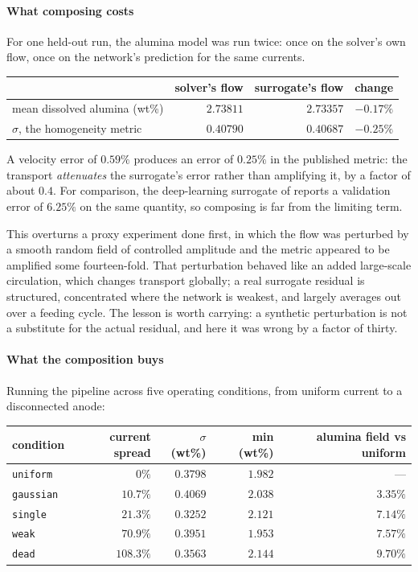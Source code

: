 \documentclass[11pt,a4paper]{article}
\theoremstyle{plain}
\theoremstyle{definition}
\theoremstyle{remark}
\begin{document}
\paragraph{What composing costs}
For one held-out run, the alumina model was run twice: once on the solver's own
flow, once on the network's prediction for the same currents.
\begin{center}
\small
\begin{tabular}{@{}lrrr@{}}
\toprule
& solver's flow & surrogate's flow & change \\
\midrule
mean dissolved alumina (wt\%)        & $2.73811$ & $2.73357$ & $-0.17\%$ \\
$\sigma$, the homogeneity metric     & $0.40790$ & $0.40687$ & $\mathbf{-0.25\%}$ \\
\bottomrule
\end{tabular}
\end{center}
A velocity error of $0.59\%$ produces an error of $0.25\%$ in the published
metric: the transport \emph{attenuates} the surrogate's error rather than
amplifying it, by a factor of about $0.4$. For comparison, the deep-learning
surrogate of \cite{patouillet} reports a validation error of $6.25\%$ on the same
quantity, so composing is far from the limiting term.

This overturns a proxy experiment done first, in which the flow was perturbed by
a smooth random field of controlled amplitude and the metric appeared to be
amplified some fourteen-fold. That perturbation behaved like an added large-scale
circulation, which changes transport globally; a real surrogate residual is
structured, concentrated where the network is weakest, and largely averages out
over a feeding cycle. The lesson is worth carrying: a synthetic perturbation is
not a substitute for the actual residual, and here it was wrong by a factor of
thirty.

\paragraph{What the composition buys}
Running the pipeline across five operating conditions, from uniform current to a
disconnected anode:
\begin{center}
\small
\begin{tabular}{@{}lrrrr@{}}
\toprule
condition & current spread & $\sigma$ (wt\%) & min (wt\%) & alumina field vs uniform \\
\midrule
\texttt{uniform}  & $0\%$     & $0.3798$ & $1.982$ & --- \\
\texttt{gaussian} & $10.7\%$  & $0.4069$ & $2.038$ & $3.35\%$ \\
\texttt{single}   & $21.3\%$  & $0.3252$ & $2.121$ & $7.14\%$ \\
\texttt{weak}     & $70.9\%$  & $0.3951$ & $\mathbf{1.953}$ & $7.57\%$ \\
\texttt{dead}     & $108.3\%$ & $0.3563$ & $2.144$ & $\mathbf{9.70\%}$ \\
\bottomrule
\end{tabular}
\end{center}
\end{document}
